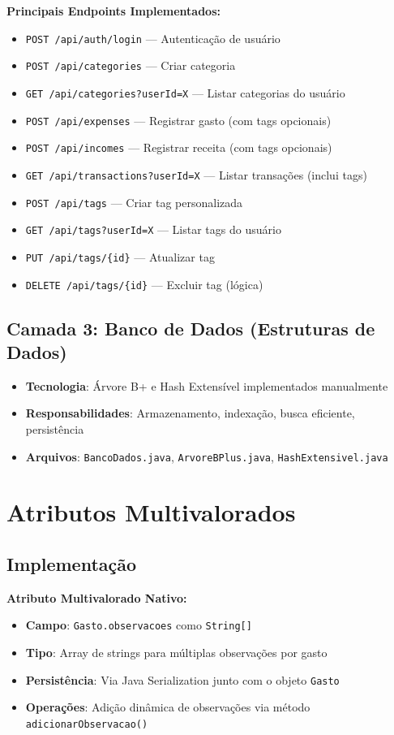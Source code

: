 \documentclass[12pt,a4paper]{article}
\begin{document}
\noindent \textbf{Principais Endpoints Implementados:}
\begin{itemize}
  \item \texttt{POST /api/auth/login} — Autenticação de usuário
  \item \texttt{POST /api/categories} — Criar categoria
  \item \texttt{GET /api/categories?userId=X} — Listar categorias do usuário
  \item \texttt{POST /api/expenses} — Registrar gasto (com tags opcionais)
  \item \texttt{POST /api/incomes} — Registrar receita (com tags opcionais)
  \item \texttt{GET /api/transactions?userId=X} — Listar transações (inclui tags)
  \item \texttt{POST /api/tags} — Criar tag personalizada
  \item \texttt{GET /api/tags?userId=X} — Listar tags do usuário
  \item \texttt{PUT /api/tags/\{id\}} — Atualizar tag
  \item \texttt{DELETE /api/tags/\{id\}} — Excluir tag (lógica)
\end{itemize}

\subsection*{Camada 3: Banco de Dados (Estruturas de Dados)}
\begin{itemize}
  \item \textbf{Tecnologia}: Árvore B+ e Hash Extensível implementados manualmente
  \item \textbf{Responsabilidades}: Armazenamento, indexação, busca eficiente, persistência
  \item \textbf{Arquivos}: \texttt{BancoDados.java}, \texttt{ArvoreBPlus.java}, \texttt{HashExtensivel.java}
\end{itemize}

\section{Atributos Multivalorados}

\subsection{Implementação}

\textbf{Atributo Multivalorado Nativo:}
\begin{itemize}
  \item \textbf{Campo}: \texttt{Gasto.observacoes} como \texttt{String[]}
  \item \textbf{Tipo}: Array de strings para múltiplas observações por gasto
  \item \textbf{Persistência}: Via Java Serialization junto com o objeto \texttt{Gasto}
  \item \textbf{Operações}: Adição dinâmica de observações via método \texttt{adicionarObservacao()}
\end{itemize}
\end{document}
